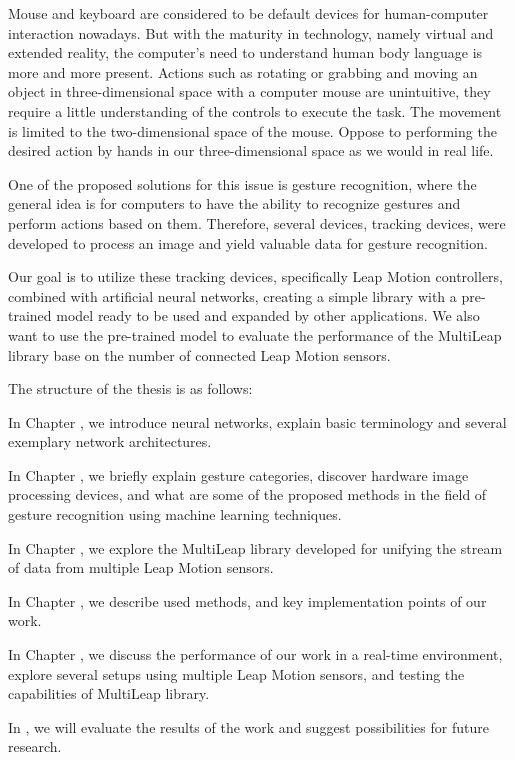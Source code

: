 Mouse and keyboard are considered to be default devices for human-computer interaction nowadays. But with the maturity in technology, namely virtual and extended reality, the computer's need to understand human body language is more and more present. Actions such as rotating or grabbing and moving an object in three-dimensional space with a computer mouse are unintuitive, they require a little understanding of the controls to execute the task. The movement is limited to the two-dimensional space of the mouse. Oppose to performing the desired action by hands in our three-dimensional space as we would in real life.

One of the proposed solutions for this issue is gesture recognition, where the general idea is for computers to have the ability to recognize gestures and perform actions based on them. Therefore, several devices, tracking devices, were developed to process an image and yield valuable data for gesture recognition.

Our goal is to utilize these tracking devices, specifically Leap Motion controllers, combined with artificial neural networks, creating a simple library with a pre-trained model ready to be used and expanded by other applications. We also want to use the pre-trained model to evaluate the performance of the MultiLeap library base on the number of connected Leap Motion sensors.

The structure of the thesis is as follows:
\begin{description}

    \item In Chapter , we introduce neural networks, explain basic terminology and several exemplary network architectures.
    
    \item In Chapter , we briefly explain gesture categories, discover hardware image processing devices, and what are some of the proposed methods in the field of gesture recognition using machine learning techniques.
    
    \item In Chapter , we explore the MultiLeap library developed for unifying the stream of data from multiple Leap Motion sensors.
    
    \item In Chapter , we describe used methods, and key implementation points of our work.
    
    \item In Chapter , we discuss the performance of our work in a real-time environment, explore several setups using multiple Leap Motion sensors, and testing the capabilities of MultiLeap library.

    \item In , we will evaluate the results of the work and suggest possibilities for future research.
\end{description}